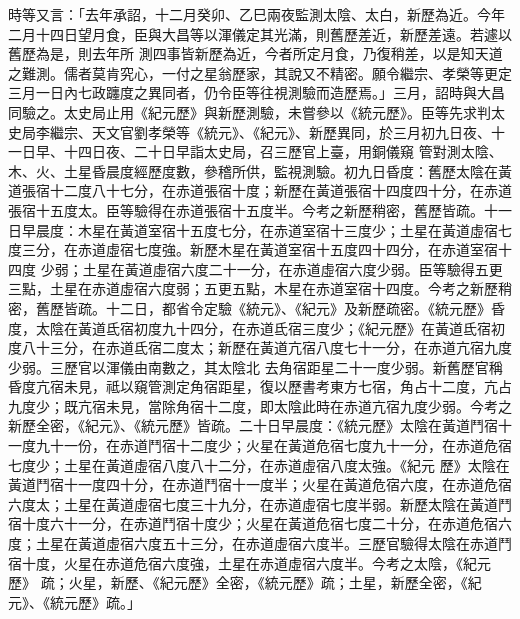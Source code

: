\begin{pinyinscope}
 時等又言：「去年承詔，十二月癸卯、乙巳兩夜監測太陰、太白，新歷為近。今年二月十四日望月食，臣與大昌等以渾儀定其光滿，則舊歷差近，新歷差遠。若遽以舊歷為是，則去年所
 測四事皆新歷為近，今者所定月食，乃復稍差，以是知天道之難測。儒者莫肯究心，一付之星翁歷家，其說又不精密。願令繼宗、孝榮等更定三月一日內七政躔度之異同者，仍令臣等往視測驗而造歷焉。」三月，詔時與大昌同驗之。太史局止用《紀元歷》與新歷測驗，未嘗參以《統元歷》。臣等先求判太史局李繼宗、天文官劉孝榮等《統元》、《紀元》、新歷異同，於三月初九日夜、十一日早、十四日夜、二十日早詣太史局，召三歷官上臺，用銅儀窺
 管對測太陰、木、火、土星昏晨度經歷度數，參稽所供，監視測驗。初九日昏度：舊歷太陰在黃道張宿十二度八十七分，在赤道張宿十度；新歷在黃道張宿十四度四十分，在赤道張宿十五度太。臣等驗得在赤道張宿十五度半。今考之新歷稍密，舊歷皆疏。十一日早晨度：木星在黃道室宿十五度七分，在赤道室宿十三度少；土星在黃道虛宿七度三分，在赤道虛宿七度強。新歷木星在黃道室宿十五度四十四分，在赤道室宿十四度
 少弱；土星在黃道虛宿六度二十一分，在赤道虛宿六度少弱。臣等驗得五更三點，土星在赤道虛宿六度弱；五更五點，木星在赤道室宿十四度。今考之新歷稍密，舊歷皆疏。十二日，都省令定驗《統元》、《紀元》及新歷疏密。《統元歷》昏度，太陰在黃道氐宿初度九十四分，在赤道氐宿三度少；《紀元歷》在黃道氐宿初度八十三分，在赤道氐宿二度太；新歷在黃道亢宿八度七十一分，在赤道亢宿九度少弱。三歷官以渾儀由南數之，其太陰北
 去角宿距星二十一度少弱。新舊歷官稱昏度亢宿未見，祗以窺管測定角宿距星，復以歷書考東方七宿，角占十二度，亢占九度少；既亢宿未見，當除角宿十二度，即太陰此時在赤道亢宿九度少弱。今考之新歷全密，《紀元》、《統元歷》皆疏。二十日早晨度：《統元歷》太陰在黃道鬥宿十一度九十一份，在赤道鬥宿十二度少；火星在黃道危宿七度九十一分，在赤道危宿七度少；土星在黃道虛宿八度八十二分，在赤道虛宿八度太強。《紀元
 歷》太陰在黃道鬥宿十一度四十分，在赤道鬥宿十一度半；火星在黃道危宿六度，在赤道危宿六度太；土星在黃道虛宿七度三十九分，在赤道虛宿七度半弱。新歷太陰在黃道鬥宿十度六十一分，在赤道鬥宿十度少；火星在黃道危宿七度二十分，在赤道危宿六度；土星在黃道虛宿六度五十三分，在赤道虛宿六度半。三歷官驗得太陰在赤道鬥宿十度，火星在赤道危宿六度強，土星在赤道虛宿六度半。今考之太陰，《紀元歷》
 疏；火星，新歷、《紀元歷》全密，《統元歷》疏；土星，新歷全密，《紀元》、《統元歷》疏。」




\end{pinyinscope}
